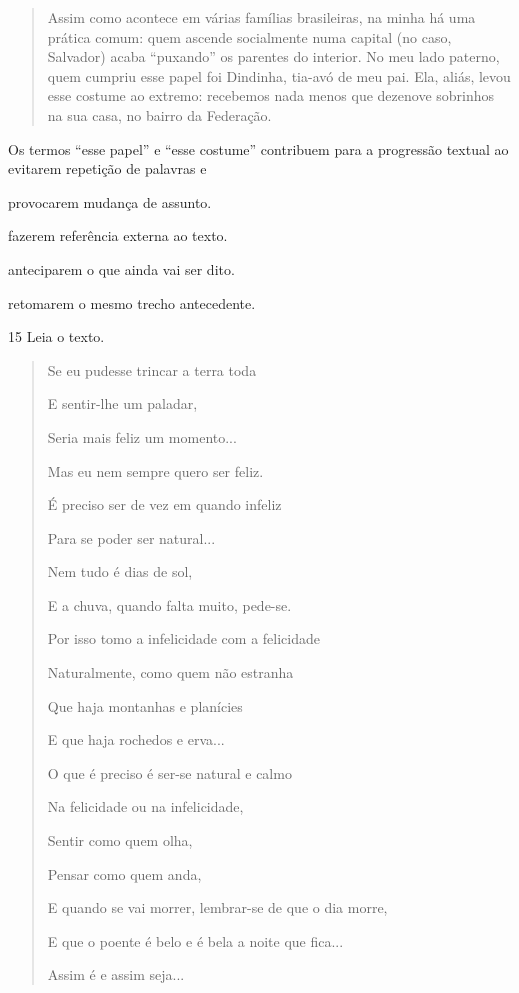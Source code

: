 \begin{quote}
Assim como acontece em várias famílias brasileiras, na minha há uma
prática comum: quem ascende socialmente numa capital (no caso, Salvador)
acaba ``puxando'' os parentes do interior. No meu lado paterno, quem
cumpriu esse papel foi Dindinha, tia-avó de meu pai. Ela, aliás, levou
esse costume ao extremo: recebemos nada menos que dezenove sobrinhos na
sua casa, no bairro da Federação.

\end{quote}

Os termos ``esse papel'' e ``esse costume'' contribuem para a progressão
textual ao evitarem repetição de palavras e

\begin{escolha}
\item provocarem mudança de assunto.

\item fazerem referência externa ao texto.

\item anteciparem o que ainda vai ser dito.

\item retomarem o mesmo trecho antecedente.
\end{escolha}

\num{15} Leia o texto.

\begin{quote}
Se eu pudesse trincar a terra toda

E sentir-lhe um paladar,

Seria mais feliz um momento...

Mas eu nem sempre quero ser feliz.

É preciso ser de vez em quando infeliz

Para se poder ser natural...

Nem tudo é dias de sol,

E a chuva, quando falta muito, pede-se.

Por isso tomo a infelicidade com a felicidade

Naturalmente, como quem não estranha

Que haja montanhas e planícies

E que haja rochedos e erva...

O que é preciso é ser-se natural e calmo

Na felicidade ou na infelicidade,

Sentir como quem olha,

Pensar como quem anda,

E quando se vai morrer, lembrar-se de que o dia morre,

E que o poente é belo e é bela a noite que fica...

Assim é e assim seja...

\end{quote}

